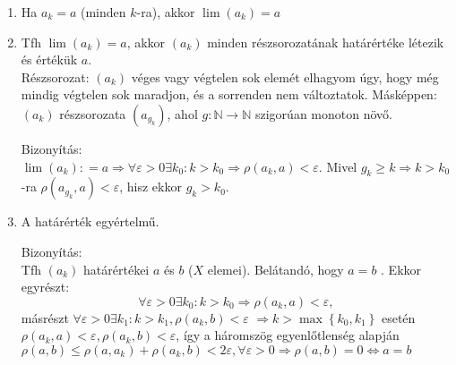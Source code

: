 \documentclass[]{scrartcl}
\newenvironment{bizonyitas}{}{}
\begin{document}
\begin{enumerate}
\def\labelenumi{\arabic{enumi}.}
\item
  Ha \(a_{k} = a\) (minden \(k\)-ra), akkor
  \(\lim\left( a_{k} \right) = a\)
\item
  Tfh \(\lim\left( a_{k} \right) = a\), akkor \(\left( a_{k} \right)\)
  minden részsorozatának határértéke létezik és értékük \(a\).\\
  Részsorozat: \(\left( a_{k} \right)\) véges vagy végtelen sok elemét
  elhagyom úgy, hogy még mindig végtelen sok maradjon, és a sorrenden
  nem változtatok. Másképpen: \(\left( a_{k} \right)\) részsorozata
  \(\left( a_{g_{k}} \right)\), ahol
  \(\left. g:{\mathbb{N}}\rightarrow{\mathbb{N}} \right.\) szigorúan
  monoton növő.

  \begin{bizonyitas}

  Bizonyítás:\\
  \(\left. \lim\left( a_{k} \right): = a\Rightarrow\forall\varepsilon > 0\exists k_{0}:k > k_{0}\Rightarrow\rho\left( {a_{k},a} \right) < \varepsilon \right.\).
  Mivel \(\left. g_{k} \geq k\Rightarrow k > k_{0} \right.\)-ra
  \(\rho\left( {a_{g_{k}},a} \right) < \varepsilon\), hisz ekkor
  \(g_{k} > k_{0}\).

  \end{bizonyitas}
\item
  A határérték egyértelmű.

  \begin{bizonyitas}

  Bizonyítás:\\
  Tfh \(\left( a_{k} \right)\) határértékei \(a\) és \(b\) (\(X\)
  elemei). Belátandó, hogy \(a = b\) . Ekkor egyrészt:
  \[\left. \forall\varepsilon > 0\exists k_{0}:k > k_{0}\Rightarrow\rho\left( {a_{k},a} \right) < \varepsilon \right.,\]
  másrészt
  \(\forall\varepsilon > 0\exists k_{1}:k > k_{1},\rho\left( {a_{k},b} \right) < \varepsilon\)
  \(\left. \Rightarrow k > \max\left\{ {k_{0},k_{1}} \right\} \right.\)
  esetén
  \(\rho\left( {a_{k},a} \right) < \varepsilon,\rho\left( {a_{k},b} \right) < \varepsilon\),
  így a háromszög egyenlőtlenség alapján
  \(\left. \rho\left( {a,b} \right) \leq \rho\left( {a,a_{k}} \right) + \rho\left( {a_{k},b} \right) < 2\varepsilon,\forall\varepsilon > 0\Rightarrow\rho\left( {a,b} \right) = 0\Leftrightarrow a = b \right.\)


\end{bizonyitas}
\end{enumerate}
\end{document}
